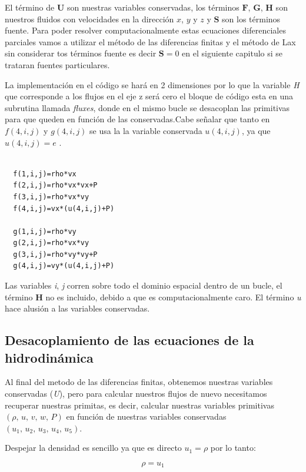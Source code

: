 \documentclass[12pt,a4paper]{book}
\begin{document}
El término de $\mathbf{U}$ son nuestras variables conservadas, los términos $\mathbf{F}$, $\mathbf{G}$, $\mathbf{H}$ son nuestros fluidos  con velocidades en la dirección $x$, $y$ y $z$ y $\mathbf{S}$ son los términos fuente. Para poder resolver computacionalmente estas ecuaciones diferenciales parciales vamos a utilizar el método de las diferencias finitas y el método de Lax sin considerar tos términos fuente es decir $\mathbf{S}=0$ en el siguiente capitulo si se trataran fuentes particulares.

La implementación en el código se hará en 2 dimensiones por lo que la variable \emph{H} que corresponde a los flujos en el eje z será cero el bloque de código esta en una subrutina llamada \emph{fluxes}, 
donde en el mismo bucle se desacoplan las primitivas para que queden en función de las conservadas.Cabe señalar que tanto en $f(4,i,j)$ y $g(4,i,j)$ se usa la
la variable conservada $u(4,i,j)$, ya que $u(4,i,j) = e$ . 


\begin{lstlisting}[frame=single]

  f(1,i,j)=rho*vx
  f(2,i,j)=rho*vx*vx+P
  f(3,i,j)=rho*vx*vy
  f(4,i,j)=vx*(u(4,i,j)+P)

  g(1,i,j)=rho*vy
  g(2,i,j)=rho*vx*vy
  g(3,i,j)=rho*vy*vy+P
  g(4,i,j)=vy*(u(4,i,j)+P)

\end{lstlisting}

Las variables \emph{i}, \emph{j} corren sobre todo el dominio espacial dentro de un bucle, el término $\mathbf{H}$ no es incluido, debido a que es computacionalmente 
caro. El término \emph{u} hace alusión a las variables conservadas.

\subsection{Desacoplamiento de las ecuaciones de la hidrodinámica}

Al final del metodo de las diferencias finitas, obtenemos nuestras variables conservadas (\emph{U}), pero para calcular nuestros flujos de nuevo necesitamos recuperar nuestras primitas, es decir, calcular nuestras variables primitivas $(\rho, \, u, \, v,\, w, \, P )$ en función de nuestras variables conservadas $(u_1, \, u_2, \, u_3, \, u_4, \, u_5)$.

Despejar la densidad es sencillo ya que es directo $u_1= \rho$ por lo tanto:

\begin{equation}\label{primitiva_densidad}
\rho = u_1
\end{equation}
\end{document}
